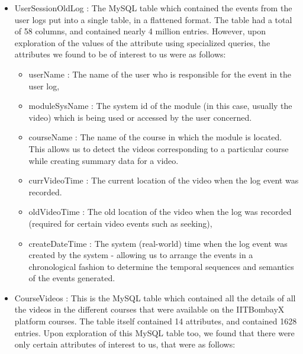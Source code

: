 \documentclass[16pt]{report}
\begin{document}
\begin{itemize}
\item UserSessionOldLog : The MySQL table which contained the events from the user logs put into a single table, in a flattened format. The table had a total of 58 columns, and contained nearly 4 million entries. However, upon exploration of the values of the attribute using specialized queries, the attributes we found to be of interest to us were as follows:

\begin{itemize}

\item userName : The name of the user who is responsible for the event in the user log, 
\item moduleSysName : The system id of the module (in this case, usually the video) which is being used or accessed by the user concerned.
\item courseName : The name of the course in which the module is located. This allows us to detect the videos corresponding to a particular course while creating summary data for a video.
\item currVideoTime : The current location of the video when the log event was recorded.
\item oldVideoTime : The old location of the video when the log was recorded (required for certain video events such as seeking), 
\item createDateTime : The system (real-world) time when the log event was created by the system - allowing us to arrange the events in a chronological fashion to determine the temporal sequences and semantics of the events generated. 

\end{itemize}

\item CourseVideos : This is the MySQL table which contained all the details of all the videos in the different courses that were available on the IITBombayX platform courses. The table itself contained 14 attributes, and contained 1628 entries. Upon exploration of this MySQL table too, we found that there were only certain attributes of interest to us, that were as follows:


\end{itemize}
\end{document}
